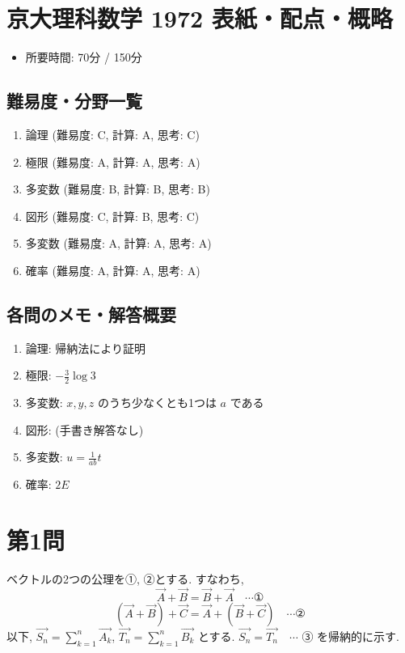 \documentclass[../main.tex]{subfiles}
\begin{document}
\section*{京大理科数学 1972 表紙・配点・概略}

\begin{itemize}
  \item 所要時間: 70分 / 150分
\end{itemize}

\subsection*{難易度・分野一覧}
\begin{enumerate}
  \item 論理 (難易度: C, 計算: A, 思考: C)
  \item 極限 (難易度: A, 計算: A, 思考: A)
  \item 多変数 (難易度: B, 計算: B, 思考: B)
  \item 図形 (難易度: C, 計算: B, 思考: C)
  \item 多変数 (難易度: A, 計算: A, 思考: A)
  \item 確率 (難易度: A, 計算: A, 思考: A)
\end{enumerate}

\subsection*{各問のメモ・解答概要}
\begin{enumerate}
  \item 論理: 帰納法により証明
  \item 極限: $-\frac{3}{2}\log 3$
  \item 多変数: $x, y, z$ のうち少なくとも1つは $a$ である
  \item 図形: (手書き解答なし)
  \item 多変数: $u = \frac{1}{ab} t$
  \item 確率: $2E$
\end{enumerate}

\newpage

\section*{第1問}

\noindent
[\textbf{解}] ベクトルの2つの公理を①, ②とする. すなわち,
\[
  \vec{A} + \vec{B} = \vec{B} + \vec{A} \quad \cdots \text{①}
\]
\[
  (\vec{A} + \vec{B}) + \vec{C} = \vec{A} + (\vec{B} + \vec{C}) \quad \cdots \text{②}
\]
以下, $\vec{S_n} = \sum_{k=1}^n \vec{A_k}$, $\vec{T_n} = \sum_{k=1}^n \vec{B_k}$ とする. $\vec{S_n} = \vec{T_n} \quad \cdots$ ③ を帰納的に示す.
\end{document}
